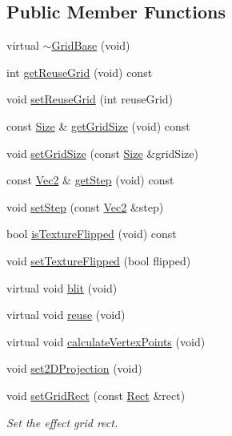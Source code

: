 \subsection*{Public Member Functions}
\begin{DoxyCompactItemize}
\item 
virtual \hyperlink{classGridBase_a26efa190f5b2fb3d4c1a789700f5f9b1}{$\sim$\+Grid\+Base} (void)
\item 
int \hyperlink{classGridBase_a09c05211ce92c3a6c8bf5a0898b2cc35}{get\+Reuse\+Grid} (void) const
\item 
void \hyperlink{classGridBase_ab87f6c1456330846fb903ab560fed507}{set\+Reuse\+Grid} (int reuse\+Grid)
\item 
const \hyperlink{classSize}{Size} \& \hyperlink{classGridBase_af251b629a734cb018d13b332c05a4724}{get\+Grid\+Size} (void) const
\item 
void \hyperlink{classGridBase_a1aaace91e60f9322a8782981dcab64b3}{set\+Grid\+Size} (const \hyperlink{classSize}{Size} \&grid\+Size)
\item 
const \hyperlink{classVec2}{Vec2} \& \hyperlink{classGridBase_a2899bd462ba7aae36eb706c94ba51016}{get\+Step} (void) const
\item 
void \hyperlink{classGridBase_a7d8d0336cded71e9a0874b4fafa4b4c7}{set\+Step} (const \hyperlink{classVec2}{Vec2} \&step)
\item 
bool \hyperlink{classGridBase_a6d6532670cbc9ef71abc19c4e2a69ffc}{is\+Texture\+Flipped} (void) const
\item 
void \hyperlink{classGridBase_a056aba2cf7d266d1484fa0196863d1e7}{set\+Texture\+Flipped} (bool flipped)
\item 
virtual void \hyperlink{classGridBase_af0d708ad2c3be26a6b74e27ec732b543}{blit} (void)
\item 
virtual void \hyperlink{classGridBase_a3567fe2ec6ea038325944d49a7bde37d}{reuse} (void)
\item 
virtual void \hyperlink{classGridBase_a339fdde120c6f38f6bc2e78d3bb7636f}{calculate\+Vertex\+Points} (void)
\item 
void \hyperlink{classGridBase_a424e6c77877c5146b05b10cb1d1c6b00}{set2\+D\+Projection} (void)
\item 
void \hyperlink{classGridBase_a078da34e2b566d89e4364ab19a37311d}{set\+Grid\+Rect} (const \hyperlink{classRect}{Rect} \&rect)
\begin{DoxyCompactList}\small\item\em Set the effect grid rect. \end{DoxyCompactList}\item 

\end{DoxyCompactItemize}
